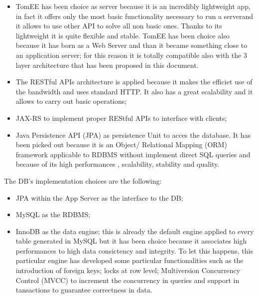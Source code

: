 \begin{itemize}
	\item TomEE has been choice as server because it is an incredibly lightweight app, in fact it offers only the most basic 				functionality necessary to run a serverand it allows to use other API to solve all non basic ones. Thanks to its lightweight it is 			quite flexible and stable. TomEE has been choice also because it has born as a Web Server and than it became something close to 		an application server; for this reason it is totally compatible also with the 3 layer architecture that has been proposed in this 			document.
	\item The RESTful APIs architecture is applied because it makes the efficiet use of the bandwidth and uses standard HTTP. It 			also has a great scalability and it allows to carry out basic operations;
	\item JAX-RS to implement proper REStful APIs to interface with clients;
	\item Java Persistence API (JPA) as persistence Unit to acces the database. It has been picked out because it is an Object/			Relational Mapping (ORM) framework applicable to RDBMS without implement direct SQL queries and because of its high 				performances , scalability, stability and quality.
\end{itemize}
The DB's implementation choices are the following:
\begin{itemize}
	\item JPA within the App Server as the interface to the DB;
	\item MySQL as the RDBMS;
	\item InnoDB as the data engine; this is already the default engine applied to every table generated in MySQL but it has been 			choice because it associates high performances to high data consictency and integrity. To let this happens, this particular 			engine has developed some particular functionalities such as the introduction of foreign keys; locks at row level; Multiversion  			Concurrency Control (MVCC) to increment the concurrency in queries and support in tansactions to guarantee correctness in data.
\end{itemize}

